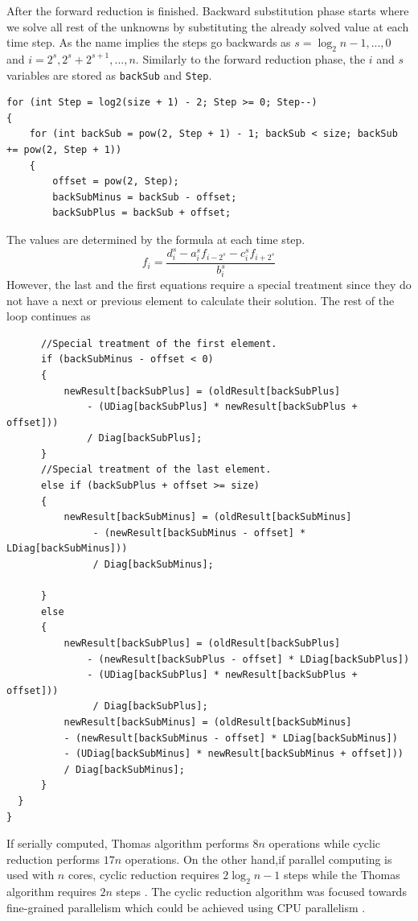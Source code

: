 \documentclass[12pt, oneside]{book}
\theoremstyle{plain}
\theoremstyle{definition}
\begin{document}
After the forward reduction is finished. Backward substitution phase starts where we solve all rest of the unknowns by substituting the already solved value at each time step. As the name implies the steps go backwards as $s = \log_2 n - 1, ... , 0$ and $ i = 2^s, 2^s + 2^{s+1}, ... , n$. Similarly to the forward reduction phase, the $i$ and $s$ variables are stored as \verb!backSub! and \verb!Step!.
\begin{verbatim}
for (int Step = log2(size + 1) - 2; Step >= 0; Step--)
{
    for (int backSub = pow(2, Step + 1) - 1; backSub < size; backSub += pow(2, Step + 1))
    {
        offset = pow(2, Step);
        backSubMinus = backSub - offset;
        backSubPlus = backSub + offset;
\end{verbatim}

The values are determined by the formula at each time step. 
\begin{equation}
f_i = \frac{d_i^{s} - a_i^{s} f_{i - 2^s}  - c_i^{s} f_{i + 2^s}}{b_i^s}
\end{equation}
However, the last and the first equations require a special treatment since they do not have a next or previous element to calculate their solution. The rest of the loop continues as
\begin{verbatim}
      //Special treatment of the first element.
      if (backSubMinus - offset < 0)
      {
          newResult[backSubPlus] = (oldResult[backSubPlus] 
              - (UDiag[backSubPlus] * newResult[backSubPlus + offset])) 
              / Diag[backSubPlus];
      }
      //Special treatment of the last element.
      else if (backSubPlus + offset >= size)
      {
          newResult[backSubMinus] = (oldResult[backSubMinus]
               - (newResult[backSubMinus - offset] * LDiag[backSubMinus]))
               / Diag[backSubMinus];

      }
      else
      {
          newResult[backSubPlus] = (oldResult[backSubPlus] 
              - (newResult[backSubPlus - offset] * LDiag[backSubPlus]) 
              - (UDiag[backSubPlus] * newResult[backSubPlus + offset]))
               / Diag[backSubPlus];
          newResult[backSubMinus] = (oldResult[backSubMinus] 
          - (newResult[backSubMinus - offset] * LDiag[backSubMinus])
          - (UDiag[backSubMinus] * newResult[backSubMinus + offset]))
          / Diag[backSubMinus];
      }
  }
}
\end{verbatim}

If serially computed, Thomas algorithm performs $ 8 n $ operations while cyclic reduction performs $17n$ operations. On the other hand,if parallel computing is used with $n$ cores, cyclic reduction requires $2 \log_2 n - 1$ steps  while the Thomas algorithm requires $2n$ steps \cite{gputri}. The cyclic reduction algorithm was focused towards fine-grained parallelism which could be achieved using CPU parallelism \cite{seltri}.
\end{document}
